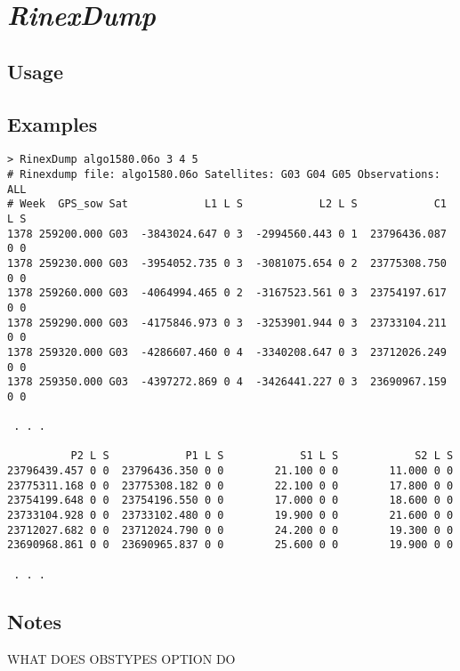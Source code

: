 \section{\emph{RinexDump}}
\subsection{Usage}
\subsection{Examples}
\begin{Verbatim}
> RinexDump algo1580.06o 3 4 5
# Rinexdump file: algo1580.06o Satellites: G03 G04 G05 Observations: ALL
# Week  GPS_sow Sat            L1 L S            L2 L S            C1 L S
1378 259200.000 G03  -3843024.647 0 3  -2994560.443 0 1  23796436.087 0 0
1378 259230.000 G03  -3954052.735 0 3  -3081075.654 0 2  23775308.750 0 0
1378 259260.000 G03  -4064994.465 0 2  -3167523.561 0 3  23754197.617 0 0
1378 259290.000 G03  -4175846.973 0 3  -3253901.944 0 3  23733104.211 0 0
1378 259320.000 G03  -4286607.460 0 4  -3340208.647 0 3  23712026.249 0 0
1378 259350.000 G03  -4397272.869 0 4  -3426441.227 0 3  23690967.159 0 0

 . . .

          P2 L S            P1 L S            S1 L S            S2 L S
23796439.457 0 0  23796436.350 0 0        21.100 0 0        11.000 0 0
23775311.168 0 0  23775308.182 0 0        22.100 0 0        17.800 0 0
23754199.648 0 0  23754196.550 0 0        17.000 0 0        18.600 0 0
23733104.928 0 0  23733102.480 0 0        19.900 0 0        21.600 0 0
23712027.682 0 0  23712024.790 0 0        24.200 0 0        19.300 0 0
23690968.861 0 0  23690965.837 0 0        25.600 0 0        19.900 0 0

 . . .
\end{Verbatim}
\subsection{Notes}
WHAT DOES OBSTYPES OPTION DO
